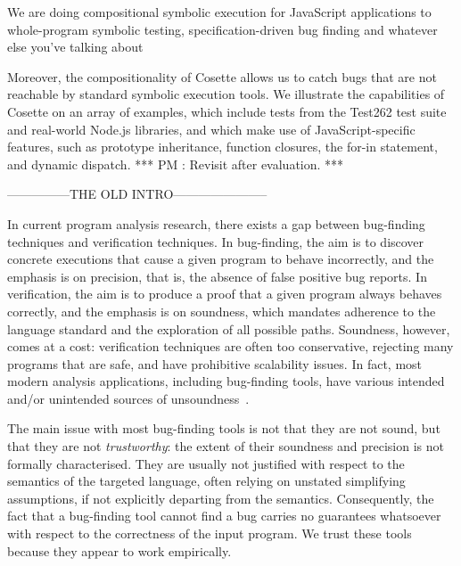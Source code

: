 \documentclass[acmsmall,review,anonymous]{acmart}\settopmatter{printfolios=true,printccs=false,printacmref=false}
\newcommand{\polish}[1]{{\color{red}#1}}
\newcommand{\cosette}{Cosette\xspace}
\newcommand{\pmaxinline}[1]{ {\color{blue} *** PM : #1 ***} }
\begin{document}

We are doing compositional symbolic execution  for JavaScript 
applications to whole-program symbolic testing, specification-driven
bug finding and whatever else you've talking about 


Moreover, the compositionality of \cosette allows us to catch bugs that are not reachable by standard symbolic execution tools.
We illustrate the capabilities of \cosette on an array of examples, which include tests from the Test262 test suite and real-world Node.js libraries, and which make use of JavaScript-specific features, such as prototype inheritance, function closures, the for-in statement, and dynamic dispatch. \pmaxinline{Revisit after evaluation.}






---------------THE OLD INTRO-----------------------

In current program analysis research, there exists a gap between bug-finding techniques and verification techniques. In bug-finding, the aim is to discover concrete executions that cause a given program to behave incorrectly, and the emphasis is on precision, that is, the absence of false positive bug reports. In verification, the aim is to produce a proof that a given program always behaves correctly, and the emphasis is on soundness, which mandates adherence to the language standard and the exploration of all possible paths.
%
Soundness, however, comes at a cost: verification techniques are often too conservative, rejecting many programs that are safe, and have prohibitive scalability issues. In fact, most modern analysis applications, including bug-finding tools, have various intended and/or unintended sources of unsoundness~\cite{soundyPaper}.
%

The main issue with most bug-finding tools is not that they are not sound, but that they are not \emph{trustworthy}: the extent of their soundness and precision is not formally characterised. They are usually not justified with respect to the semantics of the targeted language, often relying on unstated simplifying assumptions, if not explicitly departing from the semantics. Consequently, the fact that a bug-finding tool cannot find a bug carries no guarantees whatsoever with respect to the correctness of the input program. We trust these tools because they appear to work empirically.
\end{document}
